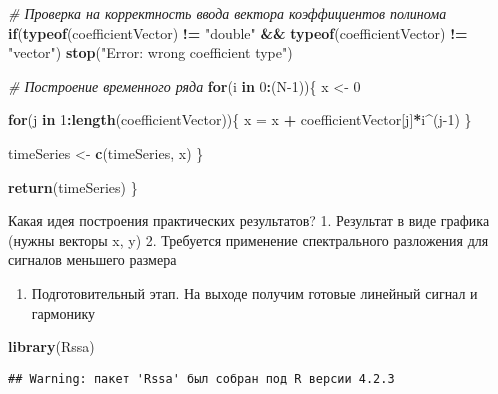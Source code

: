 \documentclass[
]{article}
\newenvironment{Shaded}{\begin{snugshade}}{\end{snugshade}}
\newcommand{\CommentTok}[1]{\textcolor[rgb]{0.56,0.35,0.01}{\textit{#1}}}
\newcommand{\ControlFlowTok}[1]{\textcolor[rgb]{0.13,0.29,0.53}{\textbf{#1}}}
\newcommand{\DecValTok}[1]{\textcolor[rgb]{0.00,0.00,0.81}{#1}}
\newcommand{\FunctionTok}[1]{\textcolor[rgb]{0.13,0.29,0.53}{\textbf{#1}}}
\newcommand{\NormalTok}[1]{#1}
\newcommand{\OtherTok}[1]{\textcolor[rgb]{0.56,0.35,0.01}{#1}}
\newcommand{\SpecialCharTok}[1]{\textcolor[rgb]{0.81,0.36,0.00}{\textbf{#1}}}
\newcommand{\StringTok}[1]{\textcolor[rgb]{0.31,0.60,0.02}{#1}}
\providecommand{\tightlist}{%
  \setlength{\itemsep}{0pt}\setlength{\parskip}{0pt}}
\begin{document}
\begin{Shaded}
\begin{Highlighting}[]
  \CommentTok{\# Проверка на корректность ввода вектора коэффициентов полинома}
  \ControlFlowTok{if}\NormalTok{(}\FunctionTok{typeof}\NormalTok{(coefficientVector) }\SpecialCharTok{!=} \StringTok{"double"} \SpecialCharTok{\&\&} \FunctionTok{typeof}\NormalTok{(coefficientVector) }\SpecialCharTok{!=} \StringTok{"vector"}\NormalTok{) }\FunctionTok{stop}\NormalTok{(}\StringTok{"Error: wrong coefficient type"}\NormalTok{)}
  
  \CommentTok{\# Построение временного ряда}
  \ControlFlowTok{for}\NormalTok{(i }\ControlFlowTok{in} \DecValTok{0}\SpecialCharTok{:}\NormalTok{(N}\DecValTok{{-}1}\NormalTok{))\{}
\NormalTok{    x }\OtherTok{\textless{}{-}} \DecValTok{0}
    
    \ControlFlowTok{for}\NormalTok{(j }\ControlFlowTok{in} \DecValTok{1}\SpecialCharTok{:}\FunctionTok{length}\NormalTok{(coefficientVector))\{}
\NormalTok{      x }\OtherTok{=}\NormalTok{ x }\SpecialCharTok{+}\NormalTok{ coefficientVector[j]}\SpecialCharTok{*}\NormalTok{i}\SpecialCharTok{\^{}}\NormalTok{(j}\DecValTok{{-}1}\NormalTok{)}
\NormalTok{    \}}
    
\NormalTok{    timeSeries }\OtherTok{\textless{}{-}} \FunctionTok{c}\NormalTok{(timeSeries, x)}
\NormalTok{  \}}
  
  \FunctionTok{return}\NormalTok{(timeSeries)}
\NormalTok{\}}
\end{Highlighting}
\end{Shaded}

Какая идея построения практических результатов? 1. Результат в виде
графика (нужны векторы x, y) 2. Требуется применение спектрального
разложения для сигналов меньшего размера

\begin{enumerate}
\def\labelenumi{\arabic{enumi}.}
\setcounter{enumi}{-1}
\tightlist
\item
  Подготовительный этап. На выходе получим готовые линейный сигнал и
  гармонику
\end{enumerate}

\begin{Shaded}
\begin{Highlighting}[]
\FunctionTok{library}\NormalTok{(Rssa)}
\end{Highlighting}
\end{Shaded}

\begin{verbatim}
## Warning: пакет 'Rssa' был собран под R версии 4.2.3
\end{verbatim}
\end{document}

